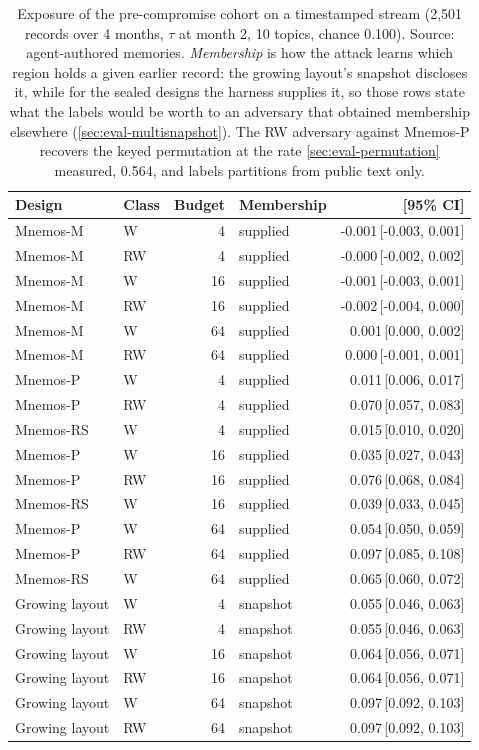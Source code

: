 \begin{table}[t]
\centering
\caption{Exposure of the pre-compromise cohort on a timestamped stream (2,501 records over 4 months, $\tau$ at month 2, 10 topics, chance 0.100). Source: agent-authored memories. \emph{Membership} is how the attack learns which region holds a given earlier record: the growing layout's snapshot discloses it, while for the sealed designs the harness supplies it, so those rows state what the labels would be worth to an adversary that obtained membership elsewhere (\cref{sec:eval-multisnapshot}). The RW adversary against Mnemos-P recovers the keyed permutation at the rate \cref{sec:eval-permutation} measured, 0.564, and labels partitions from public text only.}
\label{tab:e1}
\small
\setlength{\tabcolsep}{4pt}
\begin{tabular}{llrlr}
\toprule
Design & Class & Budget & Membership & \advhist{} [95\% CI] \\
\midrule
Mnemos-M & W & 4 & supplied & -0.001\,[-0.003, 0.001] \\
Mnemos-M & RW & 4 & supplied & -0.000\,[-0.002, 0.002] \\
Mnemos-M & W & 16 & supplied & -0.001\,[-0.003, 0.001] \\
Mnemos-M & RW & 16 & supplied & -0.002\,[-0.004, 0.000] \\
Mnemos-M & W & 64 & supplied & 0.001\,[0.000, 0.002] \\
Mnemos-M & RW & 64 & supplied & 0.000\,[-0.001, 0.001] \\
Mnemos-P & W & 4 & supplied & 0.011\,[0.006, 0.017] \\
Mnemos-P & RW & 4 & supplied & 0.070\,[0.057, 0.083] \\
Mnemos-RS & W & 4 & supplied & 0.015\,[0.010, 0.020] \\
Mnemos-P & W & 16 & supplied & 0.035\,[0.027, 0.043] \\
Mnemos-P & RW & 16 & supplied & 0.076\,[0.068, 0.084] \\
Mnemos-RS & W & 16 & supplied & 0.039\,[0.033, 0.045] \\
Mnemos-P & W & 64 & supplied & 0.054\,[0.050, 0.059] \\
Mnemos-P & RW & 64 & supplied & 0.097\,[0.085, 0.108] \\
Mnemos-RS & W & 64 & supplied & 0.065\,[0.060, 0.072] \\
Growing layout & W & 4 & snapshot & 0.055\,[0.046, 0.063] \\
Growing layout & RW & 4 & snapshot & 0.055\,[0.046, 0.063] \\
Growing layout & W & 16 & snapshot & 0.064\,[0.056, 0.071] \\
Growing layout & RW & 16 & snapshot & 0.064\,[0.056, 0.071] \\
Growing layout & W & 64 & snapshot & 0.097\,[0.092, 0.103] \\
Growing layout & RW & 64 & snapshot & 0.097\,[0.092, 0.103] \\
\bottomrule
\end{tabular}
\end{table}
